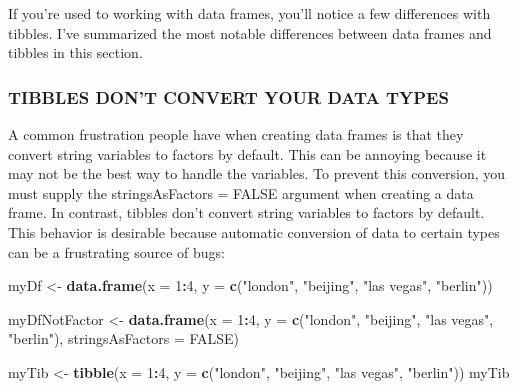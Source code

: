 \documentclass[
]{article}
\newenvironment{Shaded}{\begin{snugshade}}{\end{snugshade}}
\newcommand{\AttributeTok}[1]{\textcolor[rgb]{0.13,0.29,0.53}{#1}}
\newcommand{\ConstantTok}[1]{\textcolor[rgb]{0.56,0.35,0.01}{#1}}
\newcommand{\DecValTok}[1]{\textcolor[rgb]{0.00,0.00,0.81}{#1}}
\newcommand{\FunctionTok}[1]{\textcolor[rgb]{0.13,0.29,0.53}{\textbf{#1}}}
\newcommand{\NormalTok}[1]{#1}
\newcommand{\OtherTok}[1]{\textcolor[rgb]{0.56,0.35,0.01}{#1}}
\newcommand{\SpecialCharTok}[1]{\textcolor[rgb]{0.81,0.36,0.00}{\textbf{#1}}}
\newcommand{\StringTok}[1]{\textcolor[rgb]{0.31,0.60,0.02}{#1}}
\begin{document}
If you're used to working with data frames, you'll notice a few
differences with tibbles. I've summarized the most notable differences
between data frames and tibbles in this section.

\subsubsection{TIBBLES DON'T CONVERT YOUR DATA
TYPES}\label{tibbles-dont-convert-your-data-types}

A common frustration people have when creating data frames is that they
convert string variables to factors by default. This can be annoying
because it may not be the best way to handle the variables. To prevent
this conversion, you must supply the stringsAsFactors = FALSE argument
when creating a data frame. In contrast, tibbles don't convert string
variables to factors by default. This behavior is desirable because
automatic conversion of data to certain types can be a frustrating
source of bugs:

\begin{Shaded}
\begin{Highlighting}[]
\NormalTok{myDf }\OtherTok{\textless{}{-}} \FunctionTok{data.frame}\NormalTok{(}\AttributeTok{x =} \DecValTok{1}\SpecialCharTok{:}\DecValTok{4}\NormalTok{,}
                   \AttributeTok{y =} \FunctionTok{c}\NormalTok{(}\StringTok{"london"}\NormalTok{, }\StringTok{"beijing"}\NormalTok{, }\StringTok{"las vegas"}\NormalTok{, }\StringTok{"berlin"}\NormalTok{))}

\NormalTok{myDfNotFactor }\OtherTok{\textless{}{-}} \FunctionTok{data.frame}\NormalTok{(}\AttributeTok{x =} \DecValTok{1}\SpecialCharTok{:}\DecValTok{4}\NormalTok{,}
                            \AttributeTok{y =} \FunctionTok{c}\NormalTok{(}\StringTok{"london"}\NormalTok{, }\StringTok{"beijing"}\NormalTok{, }\StringTok{"las vegas"}\NormalTok{, }\StringTok{"berlin"}\NormalTok{),}
\AttributeTok{stringsAsFactors =} \ConstantTok{FALSE}\NormalTok{)}

\NormalTok{myTib }\OtherTok{\textless{}{-}} \FunctionTok{tibble}\NormalTok{(}\AttributeTok{x =} \DecValTok{1}\SpecialCharTok{:}\DecValTok{4}\NormalTok{,}
                \AttributeTok{y =} \FunctionTok{c}\NormalTok{(}\StringTok{"london"}\NormalTok{, }\StringTok{"beijing"}\NormalTok{, }\StringTok{"las vegas"}\NormalTok{, }\StringTok{"berlin"}\NormalTok{))}
\NormalTok{myTib}
\end{Highlighting}
\end{Shaded}
\end{document}

